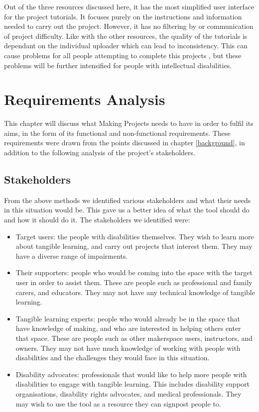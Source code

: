 \documentclass{l4proj}
\begin{document}
Out of the three resources discussed here, it has the most simplified user interface for the project tutorials. It focuses purely on the instructions and information needed to carry out the project. However, it has no filtering by or communication of project difficulty. Like with the other resources, the quality of the tutorials is dependant on the individual uploader which can lead to inconsistency. This can cause problems for all people attempting to complete this projects \citep{Wak2015}, but these problems will be further intensified for people with intellectual disabilities. 

\chapter{Requirements Analysis}
\label{requirements-analysis}
This chapter will discuss what Making Projects needs to have in order to fulfil its aims, in the form of its functional and non-functional requirements. These requirements were drawn from the points discussed in chapter \ref{background}, in addition to the following analysis of the project's stakeholders. 

\section{Stakeholders}
From the above methods we identified various stakeholders and what their needs in this situation would be. This gave us a better idea of what the tool should do and how it should do it. The stakeholders we identified were:
\begin{itemize}
    \item Target users: the people with disabilities themselves. They wish to learn more about tangible learning, and carry out projects that interest them. They may have a diverse range of impairments. 
    \item Their supporters: people who would be coming into the space with the target user in order to assist them. These are people such as professional and family carers, and educators. They may not have any technical knowledge of tangible learning. 
    \item Tangible learning experts: people who would already be in the space that have knowledge of making, and who are interested in helping others enter that space. These are people such as other makerspace users, instructors, and owners. They may not have much knowledge of working with people with disabilities and the challenges they would face in this situation.
    \item Disability advocates: professionals that would like to help more people with disabilities to engage with tangible learning. This includes disability support organisations, disability rights advocates, and medical professionals. They may wish to use the tool as a resource they can signpost people to. 
\end{itemize}
\end{document}
